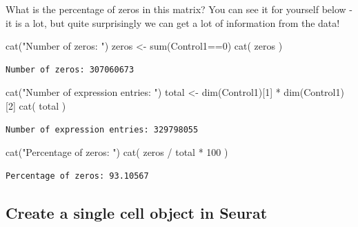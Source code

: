 \documentclass[
  letterpaper,
  DIV=11,
  numbers=noendperiod]{scrartcl}
\newenvironment{Shaded}{\begin{snugshade}}{\end{snugshade}}
\newcommand{\DecValTok}[1]{\textcolor[rgb]{0.25,0.63,0.44}{#1}}
\newcommand{\FunctionTok}[1]{\textcolor[rgb]{0.02,0.16,0.49}{#1}}
\newcommand{\NormalTok}[1]{\textcolor[rgb]{0.00,0.44,0.13}{#1}}
\newcommand{\OtherTok}[1]{\textcolor[rgb]{0.00,0.44,0.13}{#1}}
\newcommand{\SpecialCharTok}[1]{\textcolor[rgb]{0.25,0.44,0.63}{#1}}
\newcommand{\StringTok}[1]{\textcolor[rgb]{0.25,0.44,0.63}{#1}}
\begin{document}
What is the percentage of zeros in this matrix? You can see it for
yourself below - it is a lot, but quite surprisingly we can get a lot of
information from the data!

\begin{Shaded}
\begin{Highlighting}[]
\FunctionTok{cat}\NormalTok{(}\StringTok{"Number of zeros: "}\NormalTok{)}
\NormalTok{zeros }\OtherTok{\textless{}{-}}  \FunctionTok{sum}\NormalTok{(Control1}\SpecialCharTok{==}\DecValTok{0}\NormalTok{)}
\FunctionTok{cat}\NormalTok{( zeros )}
\end{Highlighting}
\end{Shaded}

\begin{verbatim}
Number of zeros: 307060673
\end{verbatim}

\begin{Shaded}
\begin{Highlighting}[]
\FunctionTok{cat}\NormalTok{(}\StringTok{"Number of expression entries: "}\NormalTok{)}
\NormalTok{total }\OtherTok{\textless{}{-}} \FunctionTok{dim}\NormalTok{(Control1)[}\DecValTok{1}\NormalTok{] }\SpecialCharTok{*} \FunctionTok{dim}\NormalTok{(Control1)[}\DecValTok{2}\NormalTok{]}
\FunctionTok{cat}\NormalTok{( total )}
\end{Highlighting}
\end{Shaded}

\begin{verbatim}
Number of expression entries: 329798055
\end{verbatim}

\begin{Shaded}
\begin{Highlighting}[]
\FunctionTok{cat}\NormalTok{(}\StringTok{"Percentage of zeros: "}\NormalTok{)}
\FunctionTok{cat}\NormalTok{( zeros }\SpecialCharTok{/}\NormalTok{ total }\SpecialCharTok{*} \DecValTok{100}\NormalTok{ )}
\end{Highlighting}
\end{Shaded}

\begin{verbatim}
Percentage of zeros: 93.10567
\end{verbatim}

\hypertarget{create-a-single-cell-object-in-seurat}{%
\subsection{Create a single cell object in
Seurat}\label{create-a-single-cell-object-in-seurat}}
\end{document}
